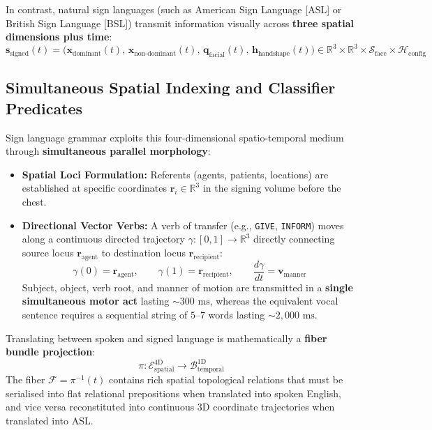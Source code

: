 \documentclass[11pt,letterpaper]{article}
\begin{document}
In contrast, natural sign languages (such as American Sign Language [ASL] or British Sign Language [BSL]) transmit information visually across \textbf{three spatial dimensions plus time}:
\begin{equation}
\mathbf{s}_{\text{signed}}(t) = \Big( \mathbf{x}_{\text{dominant}}(t), \, \mathbf{x}_{\text{non-dominant}}(t), \, \mathbf{q}_{\text{facial}}(t), \, \mathbf{h}_{\text{handshape}}(t) \Big) \in \mathbb{R}^3 \times \mathbb{R}^3 \times \mathcal{S}_{\text{face}} \times \mathcal{H}_{\text{config}}
\end{equation}

\subsection{Simultaneous Spatial Indexing and Classifier Predicates}
Sign language grammar exploits this four-dimensional spatio-temporal medium through \textbf{simultaneous parallel morphology}:
\begin{itemize}[noitemsep,topsep=1.5pt]
    \item \textbf{Spatial Loci Formulation:} Referents (agents, patients, locations) are established at specific coordinates $\mathbf{r}_i \in \mathbb{R}^3$ in the signing volume before the chest.
    \item \textbf{Directional Vector Verbs:} A verb of transfer (e.g., \texttt{GIVE}, \texttt{INFORM}) moves along a continuous directed trajectory $\gamma: [0, 1] \to \mathbb{R}^3$ directly connecting source locus $\mathbf{r}_{\text{agent}}$ to destination locus $\mathbf{r}_{\text{recipient}}$:
    \begin{equation}
    \gamma(0) = \mathbf{r}_{\text{agent}}, \qquad \gamma(1) = \mathbf{r}_{\text{recipient}}, \qquad \frac{d\gamma}{dt} = \mathbf{v}_{\text{manner}}
    \end{equation}
    Subject, object, verb root, and manner of motion are transmitted in a \textbf{single simultaneous motor act} lasting $\sim 300\text{ ms}$, whereas the equivalent vocal sentence requires a sequential string of $5$--$7$ words lasting $\sim 2{,}000\text{ ms}$.
\end{itemize}

Translating between spoken and signed language is mathematically a \textbf{fiber bundle projection}:
\begin{equation}
\pi: \mathcal{E}_{\text{spatial}}^{4\text{D}} \to \mathcal{B}_{\text{temporal}}^{1\text{D}}
\end{equation}
The fiber $\mathcal{F} = \pi^{-1}(t)$ contains rich spatial topological relations that must be serialised into flat relational prepositions when translated into spoken English, and vice versa reconstituted into continuous 3D coordinate trajectories when translated into ASL.
\end{document}
